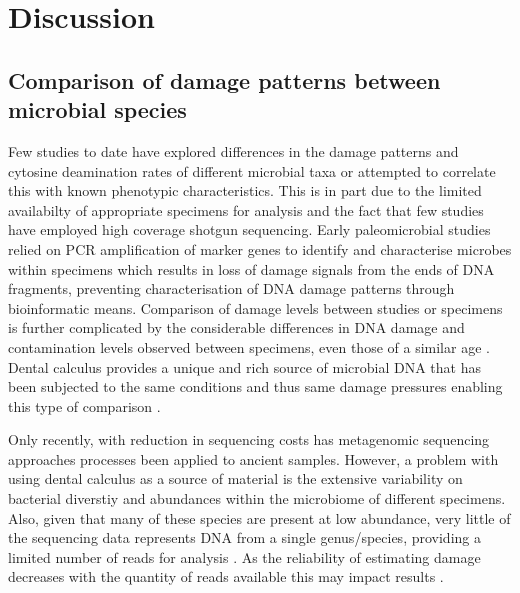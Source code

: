 \documentclass[12pt, a4paper]{article}
\begin{document}
\section{Discussion}\label{sec:discussion}

\subsection{Comparison of damage patterns between microbial species}

Few studies to date have explored differences in the damage patterns and cytosine deamination rates of different microbial taxa or attempted to correlate this with known phenotypic characteristics.
This is in part due to the limited availabilty of appropriate specimens for analysis and the fact that few studies have employed high coverage shotgun sequencing.
Early paleomicrobial studies relied on PCR amplification of marker genes \cite{Adler:2013aa} to identify and characterise microbes within specimens which results in loss of damage signals from the ends of DNA fragments, preventing characterisation of DNA damage patterns through bioinformatic means.
Comparison of damage levels between studies or specimens is further complicated by the considerable differences in DNA damage and contamination levels observed between specimens, even those of a similar age \cite{Allentoft:2012aa}.
Dental calculus provides a unique and rich source of microbial DNA that has been subjected to the same conditions and thus same damage pressures enabling this type of comparison \cite{Weyrich:2017aa}.

Only recently, with reduction in sequencing costs has metagenomic sequencing approaches processes been applied to ancient samples.
However, a problem with using dental calculus as a source of material is the extensive variability on bacterial diverstiy and abundances within the microbiome of different specimens. 
Also, given that many of these species are present at low abundance, very little of the sequencing data represents DNA from a single genus/species, providing a limited number of reads for analysis \cite{Weyrich:2017aa,Warinner:2014aa,Ziesemer:2015aa}. 
As the reliability of estimating damage decreases with the quantity of reads available this may impact results \cite{Warinner:2017aa}. 
\end{document}

